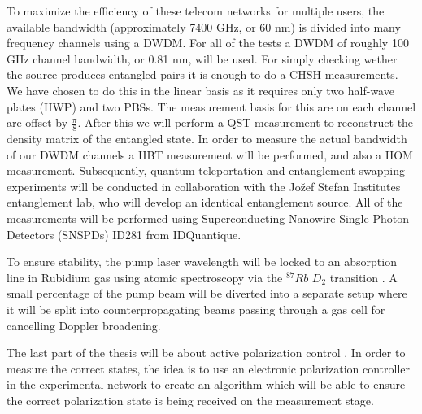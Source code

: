 \documentclass{article}
\theoremstyle{mytheoremstyle}
\theoremstyle{mytheoremstyle}
\theoremstyle{myproblemstyle}
\begin{document}
To maximize the efficiency of these telecom networks for multiple users, the available bandwidth (approximately 7400 GHz, or 60 nm)
is divided into many frequency channels using a DWDM.
For all of the tests a DWDM of roughly 100 GHz channel bandwidth, or 0.81 nm, will be used. For simply checking wether the source
produces entangled pairs it is enough to do a CHSH measurements. We have chosen to do this in the linear basis as it requires
only two half-wave plates (HWP) and two PBSs. The measurement basis for this are on each channel are offset by $\frac{\pi}{8}$. After this 
we will perform a QST measurement to reconstruct \cite{James_Kwiat_Munro_White_2001} the density matrix of the entangled state.
In order to measure the actual bandwidth of our DWDM channels a HBT measurement will be performed, and also a HOM measurement.
Subsequently, quantum teleportation \cite{Bouwmeester_Pan_Mattle_Eibl_Weinfurter_Zeilinger_1997}
and entanglement swapping \cite{Jennewein_Weihs_Pan_Zeilinger_2001} experiments will be conducted in collaboration with the Jožef Stefan Institutes
entanglement lab, who will develop an identical entanglement source.
All of the measurements will be performed using Superconducting Nanowire Single Photon Detectors (SNSPDs) ID281 from IDQuantique.

To ensure stability, the pump laser wavelength will be locked to an absorption line in Rubidium gas using atomic spectroscopy
via the $^{87}Rb$ $D_2$ transition \cite{metger2017sas}. A small percentage of the pump beam will be diverted into a separate
setup where it will be split into counterpropagating beams passing through a gas cell for cancelling Doppler broadening.

The last part of the thesis will be about active polarization control %
\cite{CCSHDCDRS}. In order to measure the correct states, the
idea is to use an electronic polarization controller in the experimental network to create an algorithm which will be able to
ensure the correct polarization state is being received on the measurement stage.
\end{document}
